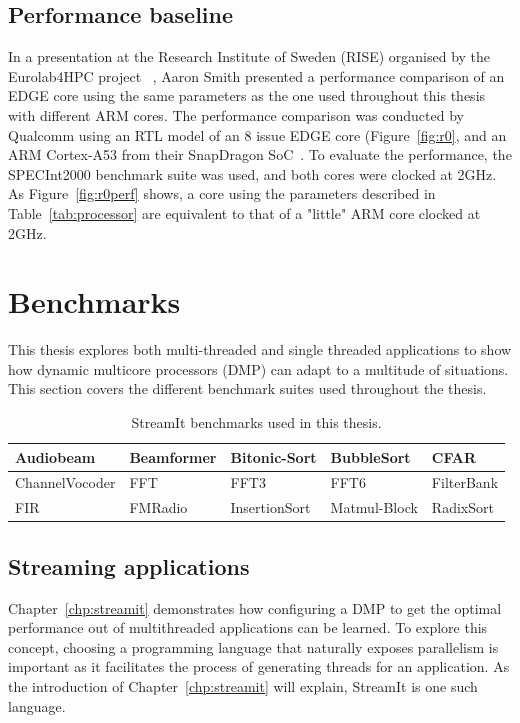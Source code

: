 \subsection{Performance baseline}

In a presentation at the Research Institute of Sweden (RISE) organised by the Eurolab4HPC project~\cite{eurolab4hpc, aarontalk} , Aaron Smith presented a performance comparison of an EDGE core using the same parameters as the one used throughout this thesis with different ARM cores.
The performance comparison was conducted by Qualcomm using an RTL model of an 8 issue EDGE core (Figure~\ref{fig:r0}, and an ARM Cortex-A53 from their SnapDragon SoC~\cite{aarontalk}.
To evaluate the performance, the SPECInt2000 benchmark suite was used, and both cores were clocked at 2GHz.
As Figure~\ref{fig:r0perf} shows, a core using the parameters described in Table~\ref{tab:processor} are equivalent to that of a "little" ARM core clocked at 2GHz.

\section{Benchmarks}
This thesis explores both multi-threaded and single threaded applications to show how dynamic multicore processors (DMP) can adapt to a multitude of situations. 
This section covers the different benchmark suites used throughout the thesis.

\begin{table}[t]
\centering
  \smaller
 \begin{tabular} { | l | l | l | l | l | }
 \hline
  Audiobeam&   Beamformer&  Bitonic-Sort  &  BubbleSort & CFAR \\ \hline
  ChannelVocoder &  FFT& FFT3 & FFT6&  FilterBank \\ \hline
  FIR &  FMRadio &   InsertionSort &   Matmul-Block &  RadixSort\\ \hline
 \end{tabular}
  \caption{StreamIt benchmarks used in this thesis.}\label{tab:streamwl}
\end{table}

\subsection{Streaming applications}\label{chp:setup:streamit}

Chapter~\ref{chp:streamit} demonstrates how configuring a DMP to get the optimal performance out of multithreaded applications can be learned.
To explore this concept, choosing a programming language that naturally exposes parallelism is important as it facilitates the process of generating threads for an application.
As the introduction of Chapter~\ref{chp:streamit} will explain, StreamIt is one such language.

